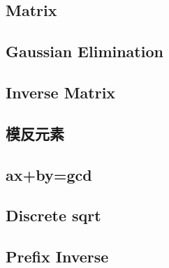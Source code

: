 \documentclass[a4paper,10pt,twocolumn,oneside]{article}
\begin{document}
\subsection{Matrix}


\subsection{Gaussian Elimination}


\subsection{Inverse Matrix}



\subsection{模反元素}


\subsection{ax+by=gcd}


\subsection{Discrete sqrt}


% 

%

%

\subsection{Prefix Inverse}

\end{document}
